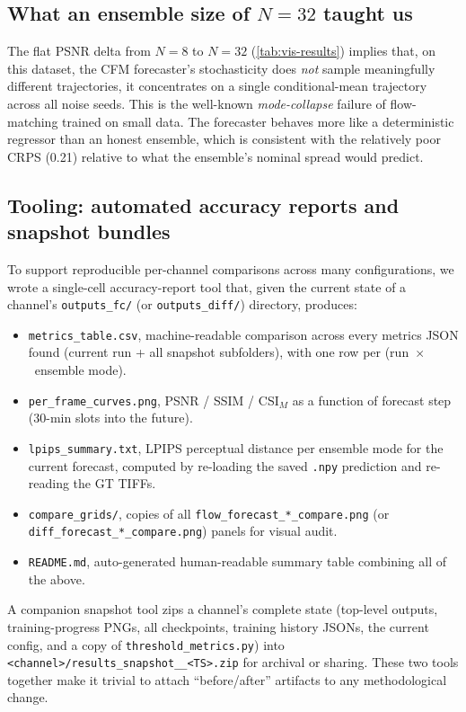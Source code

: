 \documentclass[11pt,a4paper]{article}
\begin{document}
\subsection{What an ensemble size of $N=32$ taught us}
\label{sec:n32}
The flat PSNR delta from $N\!=\!8$ to $N\!=\!32$ (\cref{tab:vis-results})
implies that, on this dataset, the CFM forecaster's stochasticity does
\emph{not} sample meaningfully different trajectories, it concentrates on
a single conditional-mean trajectory across all noise seeds. This is the
well-known \emph{mode-collapse} failure of flow-matching trained on small
data. The forecaster behaves more like a deterministic regressor than an
honest ensemble, which is consistent with the relatively poor CRPS (0.21)
relative to what the ensemble's nominal spread would predict.

\subsection{Tooling: automated accuracy reports and snapshot bundles}
\label{sec:accuracy-report}

To support reproducible per-channel comparisons across many configurations,
we wrote a single-cell accuracy-report tool that, given the current state
of a channel's \texttt{outputs\_fc/} (or \texttt{outputs\_diff/}) directory,
produces:

\begin{itemize}[leftmargin=*]
\item \texttt{metrics\_table.csv}, machine-readable comparison across
      every metrics JSON found (current run + all snapshot subfolders),
      with one row per (run~$\times$~ensemble mode).
\item \texttt{per\_frame\_curves.png}, PSNR / SSIM / CSI$_M$ as a
      function of forecast step (30-min slots into the future).
\item \texttt{lpips\_summary.txt}, LPIPS perceptual distance per
      ensemble mode for the current forecast, computed by re-loading the
      saved \texttt{.npy} prediction and re-reading the GT TIFFs.
\item \texttt{compare\_grids/}, copies of all \texttt{flow\_forecast\_*\_compare.png}
      (or \texttt{diff\_forecast\_*\_compare.png}) panels for visual audit.
\item \texttt{README.md}, auto-generated human-readable summary table
      combining all of the above.
\end{itemize}

A companion snapshot tool zips a channel's complete state (top-level
outputs, training-progress PNGs, all checkpoints, training history JSONs,
the current config, and a copy of \texttt{threshold\_metrics.py}) into
\texttt{<channel>/results\_snapshot\_<fc|diff>\_<TS>.zip} for archival or
sharing. These two tools together make it trivial to attach
``before/after'' artifacts to any methodological change.
\end{document}
